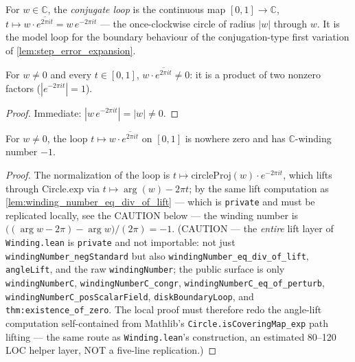 \begin{definition}
  \label{def:conj_loop}
  For $w\in\mathbb C$, the \emph{conjugate loop} is the continuous map
  $[0,1]\to\mathbb C$, $t\mapsto w\cdot\overline{e^{2\pi it}}=w\,e^{-2\pi it}$ — the
  once-clockwise circle of radius $|w|$ through $w$. It is the model loop for the
  boundary behaviour of the conjugation-type first variation of
  \cref{lem:step_error_expansion}.
\end{definition}

\begin{lemma}
  \label{lem:conj_loop_ne_zero}
  For $w\ne0$ and every $t\in[0,1]$, $w\cdot\overline{e^{2\pi it}}\ne0$: it is a product
  of two nonzero factors ($|e^{-2\pi it}|=1$).
\end{lemma}

\begin{proof}
  \leanok
  Immediate: $|w\,e^{-2\pi it}|=|w|\ne0$.
\end{proof}

\begin{lemma}
  \label{lem:winding_conj_loop}
  For $w\ne0$, the loop $t\mapsto w\cdot\overline{e^{2\pi it}}$ on $[0,1]$ is nowhere
  zero and has $\mathbb C$-winding number $-1$.
\end{lemma}

\begin{proof}

\leanok
  The normalization of the loop is $t\mapsto\mathrm{circleProj}(w)\cdot e^{-2\pi it}$,
  which lifts through $\mathrm{Circle.exp}$ via $t\mapsto\arg(w)-2\pi t$; by
  the same lift computation as \cref{lem:winding_number_eq_div_of_lift} — which is
  \texttt{private} and must be replicated locally, see the CAUTION below — the winding
  number is
  $\bigl((\arg w-2\pi)-\arg w\bigr)/(2\pi)=-1$. (CAUTION — the \emph{entire} lift layer
  of \texttt{Winding.lean} is \texttt{private} and not importable: not just
  \texttt{windingNumber\_negStandard} but also \texttt{windingNumber\_eq\_div\_of\_lift},
  \texttt{angleLift}, and the raw \texttt{windingNumber}; the public surface is only
  \texttt{windingNumberC}, \texttt{windingNumberC\_congr},
  \texttt{windingNumberC\_eq\_of\_perturb}, \texttt{windingNumberC\_posScalarField},
  \texttt{diskBoundaryLoop}, and \texttt{thm:existence\_of\_zero}. The local proof must
  therefore redo the angle-lift computation self-contained from Mathlib's
  \texttt{Circle.isCoveringMap\_exp} path lifting — the same route as
  \texttt{Winding.lean}'s construction, an estimated 80--120 LOC helper layer, NOT a
  five-line replication.)
\end{proof}

